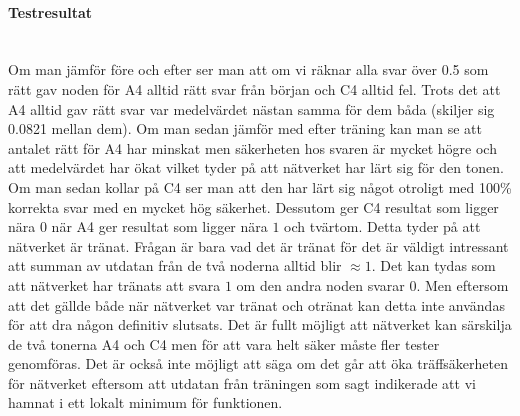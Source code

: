 \documentclass[a4paper,10pt]{article}
\begin{document}
\paragraph{Testresultat}\hspace{0pt}\\
Om man jämför före och efter ser man att om vi räknar alla svar över 0.5 som rätt gav noden för A4 alltid rätt svar från början och C4 alltid fel. Trots det att A4 alltid gav rätt svar var medelvärdet nästan samma för dem båda (skiljer sig 0.0821 mellan dem). Om man sedan jämför med efter träning kan man se att antalet rätt för A4 har minskat men säkerheten hos svaren är mycket högre och att medelvärdet har ökat vilket tyder på att nätverket har lärt sig för den tonen. Om man sedan kollar på C4 ser man att den har lärt sig något otroligt med 100\% korrekta svar med en mycket hög säkerhet. Dessutom ger C4 resultat som ligger nära $0$ när A4 ger resultat som ligger nära $1$ och tvärtom. Detta tyder på att nätverket är tränat. Frågan är bara vad det är tränat för det är väldigt intressant att summan av utdatan från de två noderna alltid blir $\approx 1$. Det kan tydas som att nätverket har tränats att svara $1$ om den andra noden svarar $0$. Men eftersom att det gällde både när nätverket var tränat och otränat kan detta inte användas för att dra någon definitiv slutsats. Det är fullt möjligt att nätverket kan särskilja de två tonerna A4 och C4 men för att vara helt säker måste fler tester genomföras. 
Det är också inte möjligt att säga om det går att öka träffsäkerheten för nätverket eftersom att utdatan från träningen som sagt indikerade att vi hamnat i ett lokalt minimum för funktionen. 

\break
\end{document}
